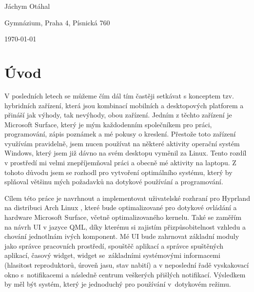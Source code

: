 \documentclass[12pt,a4paper]{article}
\begin{document}
\begin{titlepage}
    {\large Jáchym Otáhal\par} %
    {\large Gymnázium, Praha 4, Písnická 760\par}
    {\large \today} %
\end{titlepage}


\begin{abstract}
Tato práce se zabývá vývojem dotykově orientovaného uživatelského rozhraní pro Arch Linux~\autocite{ArchWiki},
umožňujícího ovládání počítače pomocí dotykových gest a stylusu. Cílem projektu bylo vytvořit modulární,
konfigurovatelný systém, který podporuje notifikace a dynamické přepínání pracovních prostředí. 
Projekt je postaven na frameworku QuickShell, ve kterém je navrhnuto veškeré UI tohoto projektu.
QuickShell \autocite{Quickshell} je rozhraní mezi deklarativním jazykem QML a operačním systémem.
Pro správu oken, pracovních prostředí a klávesových zkratek používáme moderní dynamic manager a
compositor Hyprland \autocite{HyprlandWiki2026}.
Výsledkem je uživatelské prostředí, jehož účinnost a vzhled zbytečně nezatěžuje počítač. 
\end{abstract}
\newpage

\setcounter{tocdepth}{2} %
\tableofcontents
\newpage
{}

\section{Úvod}
V posledních letech se můžeme čím dál tím častěji setkávat s konceptem tzv. hybridních zařízení,
která jsou kombinací mobilních a desktopových platforem a přináší jak výhody, tak nevýhody, obou
zařízení. Jedním z těchto zařízení je Microsoft Surface, který je mým každodenním společníkem
pro práci, programování, zápis poznámek a mé pokusy o kreslení. 
Přestože toto zařízení využívám pravidelně, jsem nucen používat na některé aktivity operační
systém Windows, který jsem již dávno na svém desktopu vyměnil za Linux. Tento rozdíl v prostředí
mi velmi znepříjemňoval práci a obecně mé aktivity na laptopu. Z tohoto důvodu jsem se 
rozhodl pro vytvoření optimálního systému, který by splňoval většinu mých požadavků na 
dotykové používání a programování. 

Cílem této práce je navrhnout a implementovat uživatelské rozhraní pro Hyprland \autocite{HyprlandWiki2026}
na distribuci Arch Linux \autocite{ArchWiki}, které bude optimalizované pro dotykové ovládání a
hardware Microsoft Surface, včetně optimalizovaného kernelu. Také se zaměřím na návrh UI v jazyce QML,
díky kterému si zajistím přizpůsobitelnost vzhledu a chování jednotlnám ivých komponent. Mé UI bude zahrnovat
základní moduly jako správce pracovních prostředí, spouštěč aplikací a správce spuštěných aplikací,
časový widget, widget se~základními systémovými informacemi (hlasitost reproduktorů, úroveň jasu, stav nabití)
a v neposlední řadě vyskakovací okno s~notifikacemi a následně centrum veškerých přišlých notifikací.
Výsledkem by měl být systém, který je jednoduchý pro používání v~dotykovém režimu.
\end{document}
